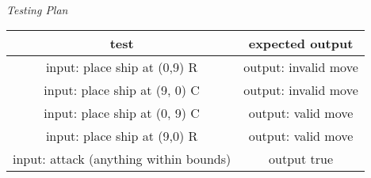 \documentclass[a4paper, 11pt]{article}
\begin{document}
	\paragraph{}
		\textit{Testing Plan} 
			\begin{center}
				\begin{tabular}{|c|c|}
					\hline
					\textbf{test} & \textbf{expected output} \\ 
					\hline 
					input: place ship at (0,9) R  & output: invalid move \\ 
					\hline
					input: place ship at (9, 0) C & output: invalid move  \\ 
					\hline
					input: place ship at (0, 9) C & output: valid move \\ 
					\hline
					input: place ship at (9,0) R & output: valid move \\ 
					\hline 
					input: attack (anything within bounds) & output true \\ 
					\hline
				\end{tabular}
			\end{center}
\end{document}
